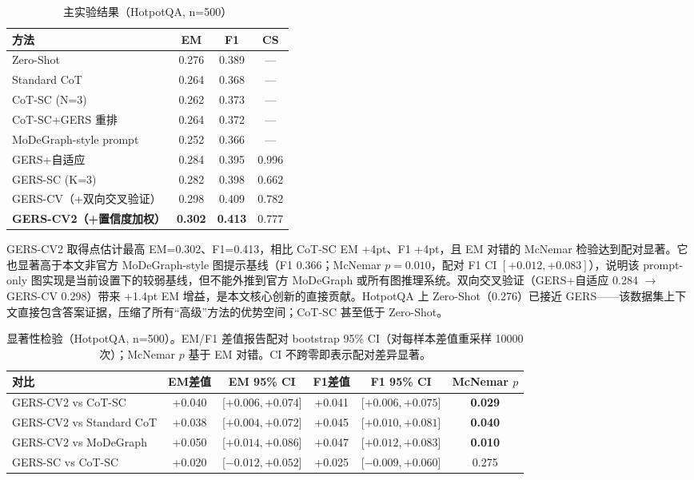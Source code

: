 \documentclass[11pt,a4paper]{ctexart}
\begin{document}
\begin{table}[h]
\centering
\caption{主实验结果（HotpotQA, n=500）}
\begin{tabular}{lccc}
\toprule
方法 & EM & F1 & CS \\
\midrule
Zero-Shot & 0.276 & 0.389 & — \\
Standard CoT & 0.264 & 0.368 & — \\
CoT-SC (N=3) & 0.262 & 0.373 & — \\
CoT-SC+GERS 重排 & 0.264 & 0.372 & — \\
MoDeGraph-style prompt & 0.252 & 0.366 & — \\
GERS+自适应 & 0.284 & 0.395 & 0.996 \\
GERS-SC (K=3) & 0.282 & 0.398 & 0.662 \\
GERS-CV（+双向交叉验证） & 0.298 & 0.409 & 0.782 \\
\textbf{GERS-CV2（+置信度加权）} & \textbf{0.302} & \textbf{0.413} & 0.777 \\
\bottomrule
\end{tabular}
\end{table}

GERS-CV2 取得点估计最高 EM=0.302、F1=0.413，相比 CoT-SC EM +4pt、F1 +4pt，且 EM 对错的 McNemar 检验达到配对显著。它也显著高于本文非官方 MoDeGraph-style 图提示基线（F1 0.366；McNemar $p=0.010$，配对 F1 CI $[+0.012,+0.083]$），说明该 prompt-only 图实现是当前设置下的较弱基线，但不能外推到官方 MoDeGraph 或所有图推理系统。双向交叉验证（GERS+自适应 0.284 $\to$ GERS-CV 0.298）带来 +1.4pt EM 增益，是本文核心创新的直接贡献。HotpotQA 上 Zero-Shot（0.276）已接近 GERS——该数据集上下文直接包含答案证据，压缩了所有``高级''方法的优势空间；CoT-SC 甚至低于 Zero-Shot。

\begin{table}[h]
\centering
\caption{显著性检验（HotpotQA, n=500）。EM/F1 差值报告配对 bootstrap 95\% CI（对每样本差值重采样 10000 次）；McNemar $p$ 基于 EM 对错。CI 不跨零即表示配对差异显著。}
\label{tab:sig}
\begin{tabular}{lccccc}
\toprule
对比 & EM差值 & EM 95\% CI & F1差值 & F1 95\% CI & McNemar $p$ \\
\midrule
GERS-CV2 vs CoT-SC & +0.040 & [$+0.006, +0.074$] & +0.041 & [$+0.006, +0.075$] & \textbf{0.029} \\
GERS-CV2 vs Standard CoT & +0.038 & [$+0.004, +0.072$] & +0.045 & [$+0.010, +0.081$] & \textbf{0.040} \\
GERS-CV2 vs MoDeGraph & +0.050 & [$+0.014, +0.086$] & +0.047 & [$+0.012, +0.083$] & \textbf{0.010} \\
GERS-SC vs CoT-SC & +0.020 & [$-0.012, +0.052$] & +0.025 & [$-0.009, +0.060$] & 0.275 \\
\bottomrule
\end{tabular}
\end{table}
\end{document}
